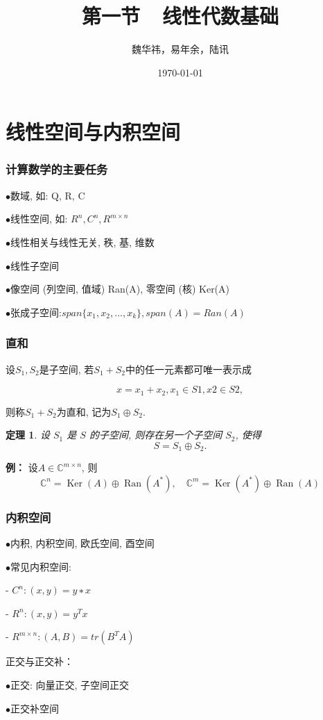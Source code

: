 \documentclass[notheorems,serif]{beamer}
\newcommand{\hei}[1]{{\HEI#1}}
\newtheorem{theorem}{\hei{定理}}
\begin{document}
\title[]{第一节~~线性代数基础}

\author[]{魏华祎，易年余，陆讯}


\date{\today}


\frame[plain]{\titlepage}



\section{线性空间与内积空间}
\begin{frame}
\frametitle{计算数学的主要任务}
$\bullet$数域, 如: Q, R, C

$\bullet$线性空间, 如: $R^n,C^n,R^{m \times n}$

$\bullet$线性相关与线性无关, 秩, 基, 维数

$\bullet$线性子空间

$\bullet$像空间 (列空间, 值域) Ran(A), 零空间 (核) Ker(A)

$\bullet$张成子空间:$span\{x_1, x_2, . . . , x_k\}, span(A) = Ran(A)$
\end{frame}

\begin{frame}
\frametitle{直和}
设$S_1, S_2$是子空间, 若$S_1 + S_2$中的任一元素都可唯一表示成

$$x = x_1 + x_2, x_1 \in S1, x2 \in S2,$$

则称$S_1 + S_2$为直和, 记为$S_1 \oplus S_2$.


\begin{theorem}
	
	设 $S_1$ 是 $S$ 的子空间, 则存在另一个子空间 $S_2$, 使得$$S = S_1 \oplus S_2.$$
	
\end{theorem}

{\bfseries  例：} \quad 设$A \in \mathbb{C}^{m \times n}$, 则
$$\mathbb{C}^{n}=\operatorname{Ker}(A) \oplus \operatorname{Ran}\left(A^{*}\right), \quad \mathbb{C}^{m}=\operatorname{Ker}\left(A^{*}\right) \oplus \operatorname{Ran}(A)$$ 
\end{frame}

\begin{frame}
\frametitle{内积空间}
\qquad$\bullet$内积, 内积空间, 欧氏空间, 酉空间
 
\qquad$\bullet$常见内积空间:
 
 \qquad\qquad - $C^{n} : (x, y) = y∗x$
 
 \qquad\qquad - $R^{n} : (x, y) = y^{T}x$
 
 \qquad\qquad - $R^{m \times n} : (A, B) = tr(B^{T}A)$
 
 正交与正交补：
 
\qquad$\bullet$正交: 向量正交, 子空间正交
 
\qquad$\bullet$正交补空间
\end{frame}
\end{document}
